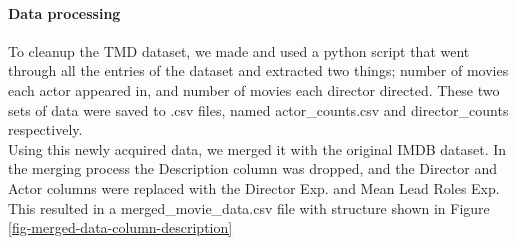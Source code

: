     \paragraph{Data processing}
        To cleanup the TMD dataset, we made and used a python script that went through all the entries of
            the dataset and extracted two things; number of movies each actor appeared in, and number of movies each director
            directed.
        These two sets of data were saved to .csv files, named actor\_counts.csv and director\_counts respectively.
        \\
        Using this newly acquired data, we merged it with the original IMDB dataset. 
        In the merging process the Description column was dropped, and the Director and Actor columns were replaced with the 
            Director Exp. and Mean Lead Roles Exp.
        This resulted in a merged\_movie\_data.csv file with structure shown in Figure \ref*{fig-merged-data-column-description}
